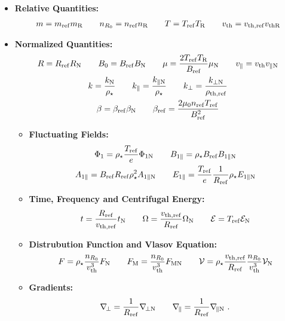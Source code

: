 \begin{itemize}
    \item \textbf{Relative Quantities:}
        \begin{gather}
            m = m_\mathrm{ref} m_\mathrm{R} \qquad n_{R_0} = n_\mathrm{ref} n_\mathrm{R} \qquad T = T_\mathrm{ref} T_\mathrm{R} \qquad v_\mathrm{th} = v_{\mathrm{th},\mathrm{ref}} v_{\mathrm{th} \mathrm{R}}
        \end{gather}
    \item \textbf{Normalized Quantities:}
        \begin{gather}
            R = R_\mathrm{ref} R_\mathrm{N} \qquad B_0 = B_\mathrm{ref} B_\mathrm{N} \qquad \mu = \frac{2 T_\mathrm{ref} T_\mathrm{R}}{B_\mathrm{ref}} \mu_\mathrm{N} \qquad v_\parallel = v_\mathrm{th} v_{\parallel \mathrm{N}} \\
            k = \frac{k_\mathrm{N}}{\rho_\star} \qquad k_\parallel = \frac{k_{\parallel \mathrm{N}}}{\rho_\star} \qquad k_\perp = \frac{k_{\perp \mathrm{N}}}{\rho_{\mathrm{th},\mathrm{ref}}} \\
            \beta = \beta_\mathrm{ref} \beta_\mathrm{N} \qquad \beta_\mathrm{ref} = \frac{2 \mu_0 n_\mathrm{ref} T_\mathrm{ref}}{B_\mathrm{ref}^2}
        \end{gather}
        \begin{itemize}
            \item \textbf{Fluctuating Fields:}
                \begin{gather}
                    \Phi_1 = \rho_\star \frac{T_\mathrm{ref}}{e} \Phi_{1 \mathrm{N}} \qquad B_{1\parallel} = \rho_\star B_\mathrm{ref} B_{1\parallel \mathrm{N}} \\
                    A_{1\parallel} = B_\mathrm{ref} R_\mathrm{ref} \rho_\star^2 A_{1\parallel \mathrm{N}} \qquad E_{1\parallel} = \frac{T_\mathrm{ref}}{e} \frac{1}{R_\mathrm{ref}} \rho_\star E_{1\parallel \mathrm{N}}
                \end{gather}
            \item \textbf{Time, Frequency and Centrifugal Energy:}
                \begin{gather}
                    t = \frac{R_\mathrm{ref}}{v_{\mathrm{th},\mathrm{ref}}} t_\mathrm{N} \qquad \Omega = \dfrac{v_{\mathrm{th},\mathrm{ref}}}{R_\mathrm{ref}} \Omega_\mathrm{N} \qquad \mathcal{E} = T_\mathrm{ref} \mathcal{E}_\mathrm{N}
                \end{gather}
            \item \textbf{Distrubution Function and Vlasov Equation:}
                \begin{gather}
                    F = \rho_\star \frac{n_{R_0}}{v_\mathrm{th}^3}F_\mathrm{N} \qquad F_\mathrm{M} = \frac{n_{R_0}}{v_\mathrm{th}^3} F_{\mathrm{M} \mathrm{N}} \qquad \mathcal{V} = \rho_\star \frac{v_{\mathrm{th},\mathrm{ref}}}{R_\mathrm{ref}}\frac{n_{R_0}}{v_\mathrm{th}^3}\mathcal{V}_\mathrm{N}
                \end{gather}
            \item \textbf{Gradients:}
                \begin{gather}
                    \nabla_{\!\perp} = \frac{1}{R_\mathrm{ref}} \nabla_{\!\perp \mathrm{N}} \qquad \nabla_{\!\parallel} = \frac{1}{R_\mathrm{ref}} \nabla_{\!\parallel \mathrm{N}} ~.
                \end{gather}
        \end{itemize}
\end{itemize}

